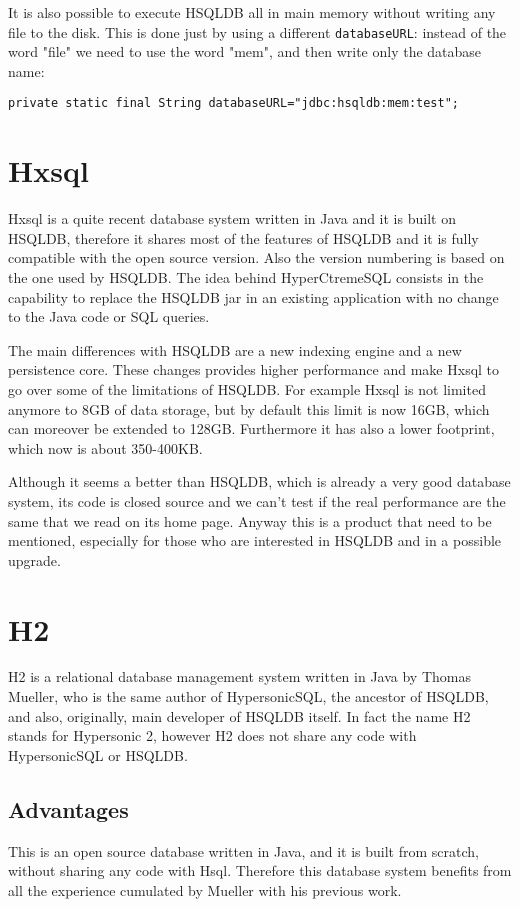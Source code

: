 It is also possible to execute HSQLDB all in main memory without writing any file to the disk. This is done just by using a different \lstinline!databaseURL!: instead of the word "file" we need to use the word "mem", and then write only the database name:
\begin{lstlisting}
private static final String databaseURL="jdbc:hsqldb:mem:test";
\end{lstlisting}			

		\section{Hxsql}
Hxsql is a quite recent database system written in Java and it is built on HSQLDB, therefore it shares most of the features of HSQLDB and it is fully compatible with the open source version. Also the version numbering is based on the one used by HSQLDB. The idea behind HyperCtremeSQL consists in the capability to replace the HSQLDB jar in an existing application with no change to the Java code or SQL queries.

The main differences with HSQLDB are a new indexing engine and a new persistence core. These changes provides higher performance and make Hxsql to go over some of the limitations of HSQLDB. For example Hxsql is not limited anymore to 8GB of data storage, but by default this limit is now 16GB, which can moreover be extended to 128GB. Furthermore it has also a lower footprint, which now is about 350-400KB. 

Although it seems a better than HSQLDB, which is already a very good database system, its code is closed source and we can't test if the real performance are the same that we read on its home page. Anyway this is a product that need to be mentioned, especially for those who are interested in HSQLDB and in a possible upgrade.

		\section{H2}
H2 is a relational database management system written in Java by Thomas Mueller, who is the same author of HypersonicSQL, the ancestor of HSQLDB, and also, originally, main developer of HSQLDB itself. In fact the name H2 stands for Hypersonic 2, however H2 does not share any code with HypersonicSQL or HSQLDB. 
		
			\subsection{Advantages}
This is an open source database written in Java, and it is built from scratch, without sharing any code with Hsql. Therefore this database system benefits from all the experience cumulated by Mueller with his previous work.


